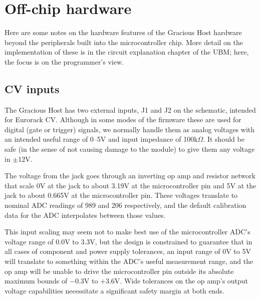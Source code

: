 
%
%
%
%
%
%

\chapter{Off-chip hardware}

Here are some notes on the hardware features of the Gracious Host hardware
beyond the peripherals built into the microcontroller chip.  More detail on
the implementation of these is in the circuit explanation chapter of the
UBM; here, the focus is on the programmer's view.

\section{CV inputs}

The Gracious Host has two external inputs, J1 and J2 on the schematic,
intended for Eurorack CV.  Although in some modes of the firmware these are
used for digital (gate or trigger) signals, we normally handle them as
analog voltages with an intended useful range of 0--5V and input impedance
of 100k$\Omega$.  It should be safe
(in the sense of not causing damage to the module) to give them any voltage
in $\pm$12V.

The voltage from the jack goes through an inverting op amp and resistor
network that scale 0V at the jack to about 3.19V at the microcontroller pin
and 5V at the jack to about 0.665V at the microcontroller pin.  These
voltages translate to nominal ADC readings of 989 and 206 respectively,
and the default calibration data for the ADC interpolates between those
values.

This input scaling may seem not to make best use of the microcontroller
ADC's voltage range of 0.0V to 3.3V, but the design is constrained to
guarantee that in all cases of component and power supply tolerances, an
input range of 0V to 5V will translate to something within the ADC's useful
measurement range, and the op amp will be unable to drive the
microcontroller pin outside its absolute maximum bounds of $-$0.3V to $+$3.6V. 
Wide tolerances on the op amp's output voltage capabilities necessitate a
significant safety margin at both ends.

